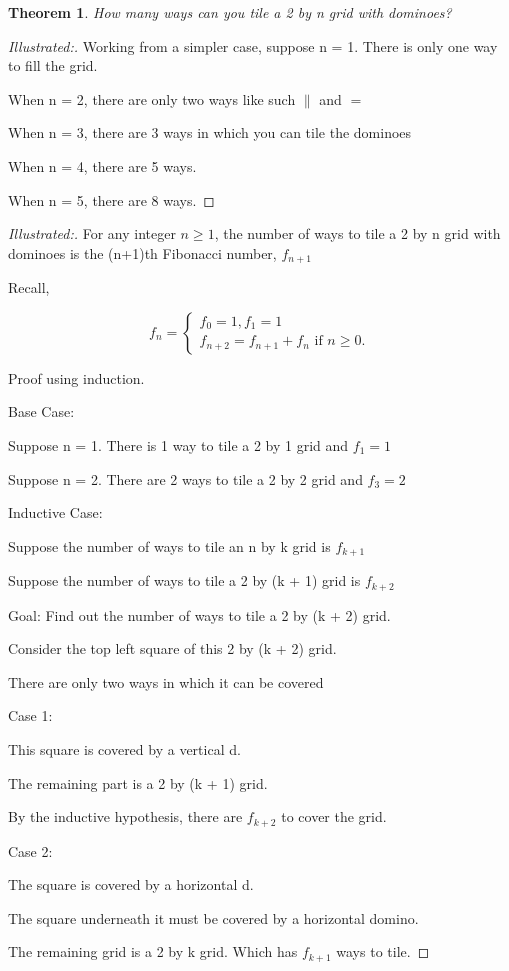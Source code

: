 \documentclass[12pt]{article}
\newtheorem{theorem}{Theorem}[section]
\begin{document}
\newpage

\begin{theorem}
    How many ways can you tile a 2 by n grid with dominoes?
\end{theorem}

\begin{proof}[Illustrated:]

    Working from a simpler case, suppose n = 1. There is only one way to fill the grid.

    When n = 2, there are only two ways like such $\|$ and $=$

    When n = 3, there are 3 ways in which you can tile the dominoes

    When n = 4, there are 5 ways.

    When n = 5, there are 8 ways.
\end{proof}

\begin{proof}[Illustrated:]
    For any integer $n \geq 1$, the number of ways to tile a 2 by n grid with dominoes is the (n+1)th Fibonacci number, $f_{n+1}$

    Recall,

    \[
    f_n = 
        \begin{cases}
        f_0 = 1, f_1 = 1 \\
        f_{n+2} = f_{n+1} + f_n \text{ if } n \geq 0.
        \end{cases}
    \]

    Proof using induction.

    Base Case: 
    
    Suppose n = 1. There is 1 way to tile a 2 by 1 grid and $f_1 = 1$

    Suppose n = 2. There are 2 ways to tile a 2 by 2 grid and $f_3 = 2$

    Inductive Case: 
    
    Suppose the number of ways to tile an n by k grid is $f_{k + 1}$

    Suppose the number of ways to tile a 2 by (k + 1) grid is $f_{k + 2}$

    Goal: Find out the number of ways to tile a 2 by (k + 2) grid.

    Consider the top left square of this 2 by (k + 2) grid.

    There are only two ways in which it can be covered

    Case 1: 

    This square is covered by a vertical d.

    The remaining part is a 2 by (k + 1) grid.

    By the inductive hypothesis, there are $f_{k + 2}$ to cover the grid.

    Case 2:

    The square is covered by a horizontal d.

    The square underneath it must be covered by a horizontal domino.

    The remaining grid is a 2 by k grid. Which has $f_{k + 1}$ ways to tile.
\end{proof}

\newpage
\end{document}
